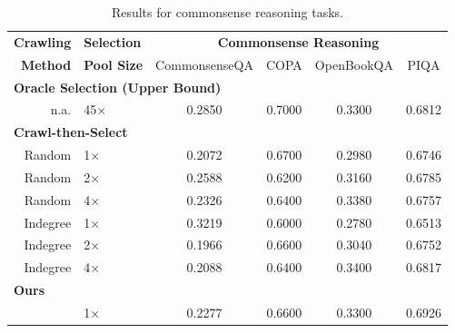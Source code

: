 \begin{table*}
    \centering
    \begin{tabular}{rlcccc}
        \toprule
        \textbf{Crawling} & \textbf{Selection} & \multicolumn{4}{c}{\textbf{Commonsense Reasoning}} \\
        \textbf{Method} & \textbf{Pool Size} & CommonsenseQA & COPA & OpenBookQA & PIQA \\
        \midrule
        \multicolumn{6}{l}{\textbf{Oracle Selection (Upper Bound)}}\\
        n.a. & 45× & 0.2850 & 0.7000 & 0.3300 & 0.6812 \\
        \multicolumn{6}{l}{\textbf{Crawl-then-Select}}\\ 
        Random & 1× & 0.2072 & 0.6700 & 0.2980 & 0.6746 \\
        Random & 2× & 0.2588 & 0.6200 & 0.3160 & 0.6785 \\
        Random & 4× & 0.2326 & 0.6400 & 0.3380 & 0.6757 \\
        Indegree & 1× & 0.3219 & 0.6000 & 0.2780 & 0.6513 \\
        Indegree & 2× & 0.1966 & 0.6600 & 0.3040 & 0.6752 \\
        Indegree & 4× & 0.2088 & 0.6400 & 0.3400 & 0.6817 \\
        \multicolumn{6}{l}{\textbf{Ours}} \\
        \ours{} & 1× & 0.2277 & 0.6600 & 0.3300 & 0.6926 \\
        \bottomrule
    \end{tabular}
    \caption{Results for commonsense reasoning tasks.}
    \label{tab:commonsense_results}
\end{table*}

